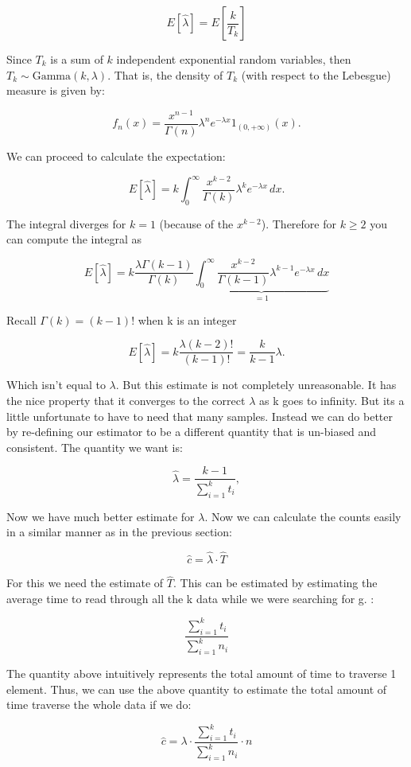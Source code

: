 \documentclass[a4paper]{article}
\begin{document}
$$E[\hat{\lambda}] = E[ \frac{k}{ T_k } ]$$

Since $T_k$ is a sum of $k$ independent exponential random variables, then $T_k\sim\mathrm{Gamma}(k,\lambda)$. That is, the density of $T_k$ (with respect to the Lebesgue) measure is given by:

$$
f_n(x)=\frac{x^{n-1}}{\Gamma(n)}\lambda^ne^{-\lambda x} 1_{(0,+\infty)}(x).
$$

We can proceed to calculate the expectation:

$$
 E\left[\hat\lambda\right]=k\int_0^\infty\frac{x^{k-2}}{\Gamma(k)}\lambda^ke^{-\lambda x}\, dx.
$$

The integral diverges for $k=1$ (because of the $x^{k-2}$).
Therefore for $k\ge2$  you can compute the integral as

$$
 E\left[\hat\lambda \right]=k\frac{\lambda\Gamma(k-1)}{\Gamma(k)}\underbrace{\int_0^\infty\frac{x^{k-2}}{\Gamma(k-1)}\lambda^{k-1}e^{-\lambda x}\, dx}_{=1}
$$

Recall $\Gamma{(k)} = (k-1)!$ when k is an integer

$$
E[\hat{\lambda}] =  k\frac{\lambda (k-2)! }{(k-1)!}= \frac k{k-1}\lambda.
$$

Which isn't equal to $\lambda$. 
But this estimate is not completely unreasonable.
It has the nice property that it converges to the correct $\lambda$ as k goes to infinity.
But its a little unfortunate to have to need that many samples.
Instead we can do better by re-defining our estimator to be a different quantity that is un-biased and consistent.
The quantity we want is:

$$
\hat\lambda =\frac{k-1}{\sum_{i=1}^k t_i},
$$


Now we have much better estimate for $\lambda$.
Now we can calculate the counts easily in a similar manner as in the previous section:

$$\hat{c} = \hat{\lambda} \cdot \hat{T} $$

For this we need the estimate of $\hat{T}$.
This can be estimated by estimating the average time to read through all the k data while we were searching for g. :

$$ \frac{ \sum^{k}_{i=1} t_i }{ \sum^{k}_{i=1} n_i}$$

The quantity above intuitively represents the total amount of time to traverse 1 element.
Thus, we can use the above quantity to estimate the total amount of time traverse the whole data if we do:

$$\hat{c}  = \lambda \cdot \frac{\sum^{k}_{i=1} t_i}{\sum^{k}_{i=1} n_i} \cdot n $$
\end{document}
